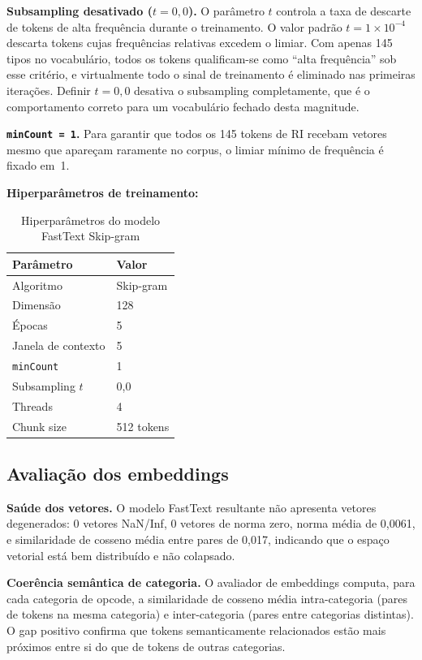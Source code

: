 \textbf{Subsampling desativado ($t = 0{,}0$).} O parâmetro $t$ controla a taxa de
descarte de tokens de alta frequência durante o treinamento. O valor padrão
$t = 1 \times 10^{-4}$ descarta tokens cujas frequências relativas excedem o
limiar. Com apenas 145 tipos no vocabulário, todos os tokens qualificam-se como
``alta frequência'' sob esse critério, e virtualmente todo o sinal de treinamento é
eliminado nas primeiras iterações. Definir $t = 0{,}0$ desativa o subsampling
completamente, que é o comportamento correto para um vocabulário fechado desta
magnitude.

\textbf{\texttt{minCount = 1}.} Para garantir que todos os 145 tokens de RI
recebam vetores mesmo que apareçam raramente no corpus, o limiar mínimo de
frequência é fixado em~1.

\textbf{Hiperparâmetros de treinamento:}

\begin{table}[htb]
\centering
\caption{Hiperparâmetros do modelo FastText Skip-gram}
\label{tab:fasttext-hp}
\begin{tabular}{ll}
\toprule
\textbf{Parâmetro} & \textbf{Valor} \\
\midrule
Algoritmo            & Skip-gram \\
Dimensão             & 128 \\
Épocas               & 5 \\
Janela de contexto   & 5 \\
\texttt{minCount}    & 1 \\
Subsampling $t$      & 0,0 \\
Threads       & 4 \\
Chunk size    & 512 tokens \\
\bottomrule
\end{tabular}

\end{table}

\subsection{Avaliação dos embeddings}
\label{sub:fasttext-eval}

\textbf{Saúde dos vetores.} O modelo FastText resultante não apresenta vetores
degenerados: 0 vetores NaN/Inf, 0 vetores de norma zero, norma média de 0,0061, e
similaridade de cosseno média entre pares de 0,017, indicando que o espaço
vetorial está bem distribuído e não colapsado.

\textbf{Coerência semântica de categoria.} O avaliador de embeddings computa, para cada categoria de opcode, a
similaridade de cosseno média intra-categoria (pares de tokens na mesma
categoria) e inter-categoria (pares entre categorias distintas). O
gap positivo confirma que tokens semanticamente relacionados estão mais
próximos entre si do que de tokens de outras categorias.

